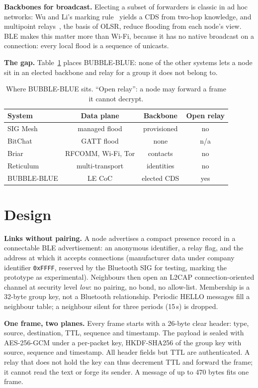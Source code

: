 \documentclass[10pt,twocolumn,letterpaper]{article}
\newcommand{\sub}[1]{\smallskip\noindent\textsf{\textbf{#1}}\enspace}
\begin{document}
\sub{Backbones for broadcast.} Electing a subset of forwarders is classic
in ad hoc networks: Wu and Li's marking rule~\cite{wuli1999} yields a CDS
from two-hop knowledge, and multipoint relays~\cite{qayyum2002}, the basis
of OLSR, reduce flooding from each node's view. BLE makes
this matter more than Wi-Fi, because it has no native broadcast on a
connection: every local flood is a sequence of unicasts.

\sub{The gap.} Table~\ref{tab:not} places BUBBLE-BLUE: none of the other
systems lets a node sit in an elected backbone and relay for a group it
does not belong to.

\begin{table}[t]
\centering
\caption{Where BUBBLE-BLUE sits. ``Open relay'': a node may forward a
frame it cannot decrypt.}
\label{tab:not}
\footnotesize
\begin{tabular}{@{}lccc@{}}
\toprule
System & Data plane & Backbone & Open relay \\
\midrule
SIG Mesh~\cite{mesh-profile} & managed flood & provisioned & no \\
BitChat~\cite{bitchat} & GATT flood & none & n/a \\
Briar~\cite{briar} & RFCOMM, Wi-Fi, Tor & contacts & no \\
Reticulum~\cite{reticulum} & multi-transport & identities & no \\
BUBBLE-BLUE & LE CoC & elected CDS & yes \\
\bottomrule
\end{tabular}
\end{table}

\section{Design}

\sub{Links without pairing.} A node advertises a compact presence record
in a connectable BLE advertisement: an anonymous identifier, a relay
flag, and the address at which it accepts connections (manufacturer data
under company identifier \texttt{0xFFFF}, reserved by the Bluetooth SIG
for testing, marking the prototype as experimental). Neighbours then open
an L2CAP connection-oriented channel at security level \emph{low}: no
pairing, no bond, no allow-list. Membership is a 32-byte group key, not a
Bluetooth relationship. Periodic HELLO messages fill a neighbour table; a
neighbour silent for three periods (15\,s) is dropped.

\sub{One frame, two planes.} Every frame starts with a 26-byte clear
header: type, source, destination, TTL, sequence and timestamp. The
payload is sealed with AES-256-GCM under a per-packet key,
HKDF-SHA256 of the group key with source, sequence and timestamp. All
header fields but TTL are authenticated. A relay that does not hold the
key can thus decrement TTL and forward the frame; it cannot read the text
or forge its sender. A message of up to 470 bytes fits one frame.
\end{document}

